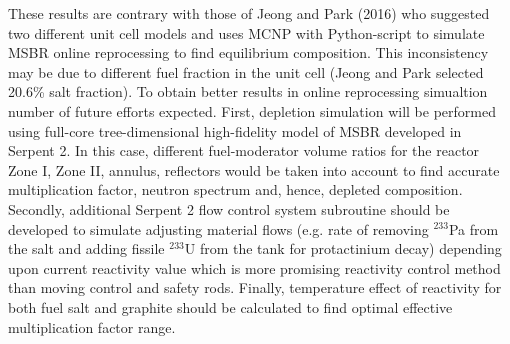 \documentclass{anstrans}
\begin{document}
These results are contrary with those of Jeong and Park (2016) who suggested two different unit cell models and uses \gls{MCNP} with Python-script to simulate \gls{MSBR} online reprocessing to find equilibrium composition. This inconsistency may be due to different fuel fraction in the unit cell (Jeong and Park selected 20.6\% salt fraction). To obtain better results in online reprocessing simualtion number of future efforts expected. First, depletion simulation will be performed using full-core tree-dimensional high-fidelity model of \gls{MSBR} developed in Serpent 2. In this case, different fuel-moderator volume ratios for the reactor Zone I, Zone II, annulus, reflectors would be taken into account to find accurate multiplication factor, neutron spectrum and, hence, depleted composition. Secondly, additional Serpent 2 flow control system subroutine should be developed to simulate adjusting material flows (e.g. rate of removing $^{233}$Pa from the salt and adding fissile $^{233}$U from the tank for protactinium decay) depending upon current reactivity value which is more promising reactivity control method than moving control and safety rods. Finally, temperature effect of reactivity for both fuel salt and graphite should be calculated to find optimal effective multiplication factor range. 



\end{document}

